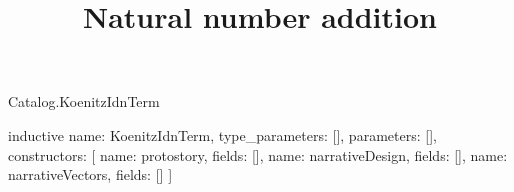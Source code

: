 \begin{lexlean}{Catalog.KoenitzIdnTerm}
\title{Natural number addition}
\begin{semanticmodule}
inductive{
  name: KoenitzIdnTerm,
  type_parameters: [],
  parameters: [],
  constructors: [
    {name: protostory, fields: []},
    {name: narrativeDesign, fields: []},
    {name: narrativeVectors, fields: []}
  ]
}
\end{semanticmodule}
\end{lexlean}
